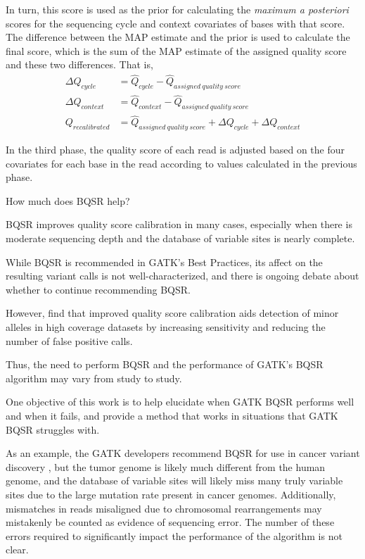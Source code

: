 \documentclass{article}
\begin{document}
\begin{outline}
\begin{outline}
		\item In turn, this score is used as the prior for calculating the \textit{maximum a posteriori} scores for the sequencing cycle and context covariates of bases with that score. The difference between the MAP estimate and the prior is used to calculate the final score, which is the sum of the MAP estimate of the assigned quality score and these two differences. That is,
		\begin{align}
		\Delta Q_{cycle} &= \hat{Q}_{cycle} - \hat{Q}_{assigned\:quality\:score} \\
		\Delta Q_{context} &= \hat{Q}_{context} - \hat{Q}_{assigned\:quality\:score} \\
		Q_{recalibrated} &= \hat{Q}_{assigned\:quality\:score} + \Delta Q_{cycle} + \Delta Q_{context}
		\end{align}
		\item In the third phase, the quality score of each read is adjusted based on the four covariates for each base in the read according to values calculated in the previous phase.
	\end{outline}
	\item How much does BQSR help?
	\begin{outline}
		\item BQSR improves quality score calibration in many cases, especially when there is moderate sequencing depth and the database of variable sites is nearly complete. %
		\item While BQSR is recommended in GATK's Best Practices, its affect on the resulting variant calls is not well-characterized, and there is ongoing debate about whether to continue recommending BQSR. \parencite{van_der_auwera_geraldine_2020} %
		\item However, \cite{ni_improvement_2016} find that improved quality score calibration aids detection of minor alleles in high coverage datasets by increasing sensitivity and reducing the number of false positive calls.
		\item Thus, the need to perform BQSR and the performance of GATK's BQSR algorithm may vary from study to study.
		\item One objective of this work is to help elucidate when GATK BQSR performs well and when it fails, and provide a method that works in situations that GATK BQSR struggles with.
		\item As an example, the GATK developers recommend BQSR for use in cancer variant discovery \parencite{cibulskis_sensitive_2013}, but the tumor genome is likely much different from the human genome, and the database of variable sites will likely miss many truly variable sites due to the large mutation rate present in cancer genomes. Additionally, mismatches in reads misaligned due to chromosomal rearrangements may mistakenly be counted as evidence of sequencing error. The number of these errors required to significantly impact the performance of the algorithm is not clear.
	\end{outline}
\end{outline}
\end{document}
